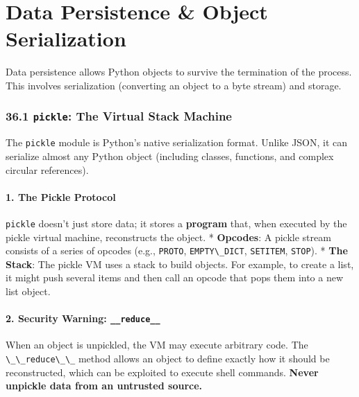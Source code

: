 \hypertarget{data-persistence-object-serialization}{%
\chapter{Data Persistence \& Object
Serialization}\label{data-persistence-object-serialization}}

Data persistence allows Python objects to survive the termination of the
process. This involves serialization (converting an object to a byte
stream) and storage.

\hypertarget{pickle-the-virtual-stack-machine}{%
\subsection{\texorpdfstring{36.1 \texttt{pickle}: The Virtual Stack
Machine}{36.1 pickle: The Virtual Stack Machine}}\label{pickle-the-virtual-stack-machine}}

The \passthrough{\lstinline!pickle!} module is Python's native
serialization format. Unlike JSON, it can serialize almost any Python
object (including classes, functions, and complex circular references).

\hypertarget{the-pickle-protocol}{%
\subsubsection{1. The Pickle Protocol}\label{the-pickle-protocol}}

\passthrough{\lstinline!pickle!} doesn't just store data; it stores a
\textbf{program} that, when executed by the pickle virtual machine,
reconstructs the object. * \textbf{Opcodes}: A pickle stream consists of
a series of opcodes (e.g., \passthrough{\lstinline!PROTO!},
\passthrough{\lstinline!EMPTY\_DICT!},
\passthrough{\lstinline!SETITEM!}, \passthrough{\lstinline!STOP!}). *
\textbf{The Stack}: The pickle VM uses a stack to build objects. For
example, to create a list, it might push several items and then call an
opcode that pops them into a new list object.

\hypertarget{security-warning-__reduce__}{%
\subsubsection{\texorpdfstring{2. Security Warning:
\texttt{\_\_reduce\_\_}}{2. Security Warning: \_\_reduce\_\_}}\label{security-warning-__reduce__}}

When an object is unpickled, the VM may execute arbitrary code. The
\passthrough{\lstinline!\_\_reduce\_\_!} method allows an object to
define exactly how it should be reconstructed, which can be exploited to
execute shell commands. \textbf{Never unpickle data from an untrusted
source.}

